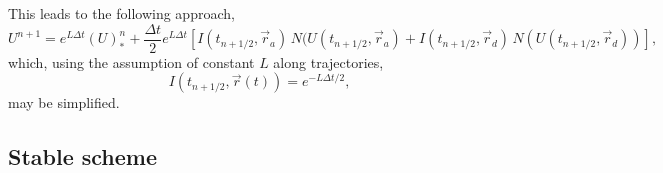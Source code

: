 \documentclass[10pt,a4paper]{article}
\begin{document}

This leads to the following approach,
\begin{equation}
U^{n+1}=e^{L \Delta t}(U)^{n}_{*}+\frac{\Delta t}{2}e^{L\Delta t}\left[ I(t_{n+1/2}, \vec{r}_a)\, N(U(t_{n+1/2}, \vec{r}_a)+I(t_{n+1/2}, \vec{r}_d)\, N(U(t_{n+1/2}, \vec{r}_d))\right],
\end{equation}
which, using the assumption of constant $L$ along trajectories,
\begin{equation}
 I(t_{n+1/2}, \vec{r}(t))=e^{-L\Delta t/2},
\end{equation} 
may be simplified.

%

\subsection{Stable scheme}
\end{document}
